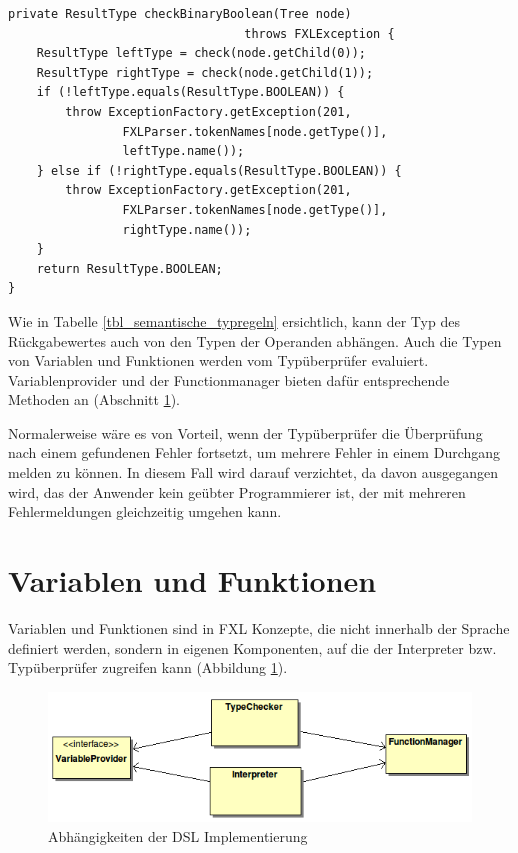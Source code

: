 \begin{lstlisting}[float = htbp,caption={Typüberprüfung der binären booleschen Operatoren},label=listing_check_binary_boolean]
private ResultType checkBinaryBoolean(Tree node)
                                 throws FXLException {
	ResultType leftType = check(node.getChild(0));
	ResultType rightType = check(node.getChild(1));
	if (!leftType.equals(ResultType.BOOLEAN)) {
		throw ExceptionFactory.getException(201,
				FXLParser.tokenNames[node.getType()],
				leftType.name());
	} else if (!rightType.equals(ResultType.BOOLEAN)) {
		throw ExceptionFactory.getException(201,
				FXLParser.tokenNames[node.getType()],
				rightType.name());
	}
	return ResultType.BOOLEAN;
}
\end{lstlisting}	

Wie in Tabelle \ref{tbl_semantische_typregeln} ersichtlich, kann der Typ des Rückgabewertes auch von den Typen der Operanden abhängen. Auch die Typen von Variablen und Funktionen werden vom Typüberprüfer evaluiert. Variablenprovider und der Functionmanager bieten dafür entsprechende Methoden an (Abschnitt \ref{section_implementierung_variablen_und_funktionen}).

Normalerweise wäre es von Vorteil, wenn der Typüberprüfer die Überprüfung nach einem gefundenen Fehler fortsetzt, um mehrere Fehler in einem Durchgang melden zu können. In diesem Fall wird darauf verzichtet, da davon ausgegangen wird, das der Anwender kein geübter Programmierer ist, der mit mehreren Fehlermeldungen gleichzeitig umgehen kann.

\section{Variablen und Funktionen}
\label{section_implementierung_variablen_und_funktionen}

Variablen und Funktionen sind in FXL Konzepte, die nicht innerhalb der Sprache definiert werden, sondern in eigenen Komponenten, auf die der Interpreter bzw. Typüberprüfer zugreifen kann (Abbildung \ref{figure_dsl_overview}). 

\begin{figure}[h]
\includegraphics[scale=0.7]{figures/uml_dsl_overview}
\caption{Abhängigkeiten der DSL Implementierung}
\label{figure_dsl_overview}
\end{figure}



